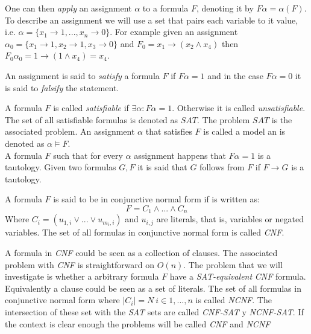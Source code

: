 \begin{definition}
    
    One can then \emph{apply} an assignment $\alpha$ to a formula $F$, denoting it by $F\alpha=\alpha(F)$. To describe an assignment we will use a set that pairs each variable to it value, i.e. $\alpha=\{x_1\to 1,...,x_n\to 0\}$. For example given an assignment $\alpha_0 = \{x_1 \to 1, x_2\to 1, x_3 \to 0\}$ and $F_0=x_1\to (x_2\wedge x_4)$ then  $F_0\alpha_0=1 \to (1\wedge x_4)= x_4$. \\
    
    \begin{definition}
      An assignment is said to \emph{satisfy}  a formula $F$ if $F\alpha=1$ and in the case $F  \alpha = 0 $ it is said to \emph{falsify} the statement.
    \end{definition}
    
    \begin{definition}
      A formula $F$ is called \emph{satisfiable} if $\exists \alpha : F\alpha = 1.$ Otherwise it is called \emph{unsatisfiable}. The set of all satisfiable formulas is denoted as $SAT$.  The problem $SAT$ is the associated problem. 	An assignment $\alpha$ that satisfies $F$ is called a model an is denoted as $\alpha \models F$.\\
      
      
      A formula $F$ such that for every  $\alpha$ assignment happens that $F\alpha=1$ is a tautology. Given two formulas $G,F$ it is said that $G$ follows from $F$ if $F\rightarrow G$ is a tautology. \\
    \end{definition}
    
    
    
    \begin{definition}
      A formula $F$ is said to be in conjunctive normal form if is written as:
      $$F = C_1\wedge ... \wedge C_n$$
      Where $C_i = (u_{1,i} \vee ... \vee u_{m_i,i})$  and $u_{i,j}$ are literals, that is, variables or negated variables. The set of all formulas in conjunctive normal form is called \emph{CNF}.

    \end{definition}
    
    A formula in \emph{CNF} could be seen as a collection of clauses. The associated problem with \emph{CNF} is straightforward on $O(n)$. The problem that we will investigate is whether a arbitrary formula $F$ have a \emph{SAT-equivalent} \emph{CNF} formula.
    Equivalently a clause could be seen as a set of literals. The set of all formulas in conjunctive normal form where $|C_i| = N\ i \in 1,...,n$ is called \emph{NCNF}. The intersection of these set with the \emph{SAT} sets are called \emph{CNF-SAT} y \emph{NCNF-SAT}. If the context is clear enough the problems will be called \emph{CNF} and \emph{NCNF}\\



\end{definition}
